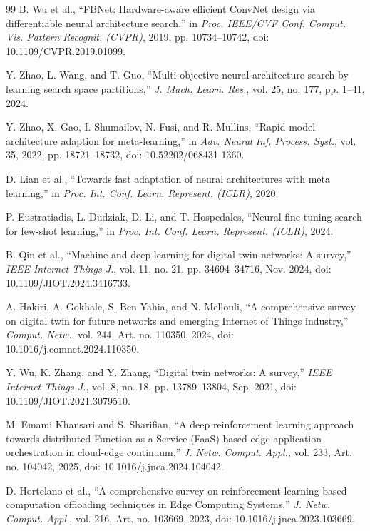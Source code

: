 \documentclass[a4paper,fleqn]{cas-sc}
\begin{document}
\begin{thebibliography}{99}
B. Wu et al., ``FBNet: Hardware-aware efficient ConvNet design via differentiable neural architecture search,'' in \emph{Proc. IEEE/CVF Conf. Comput. Vis. Pattern Recognit. (CVPR)}, 2019, pp. 10734--10742, doi: 10.1109/CVPR.2019.01099.

Y. Zhao, L. Wang, and T. Guo, ``Multi-objective neural architecture search by learning search space partitions,'' \emph{J. Mach. Learn. Res.}, vol. 25, no. 177, pp. 1--41, 2024.

Y. Zhao, X. Gao, I. Shumailov, N. Fusi, and R. Mullins,
``Rapid model architecture adaption for meta-learning,''
in \emph{Adv. Neural Inf. Process. Syst.},
vol. 35, 2022, pp. 18721--18732,
doi: 10.52202/068431-1360.

D. Lian et al.,
``Towards fast adaptation of neural architectures with meta learning,''
in \emph{Proc. Int. Conf. Learn. Represent. (ICLR)}, 2020.

P. Eustratiadis, L. Dudziak, D. Li, and T. Hospedales,
``Neural fine-tuning search for few-shot learning,''
in \emph{Proc. Int. Conf. Learn. Represent. (ICLR)}, 2024.

B. Qin et al., ``Machine and deep learning for digital twin networks: A survey,'' \emph{IEEE Internet Things J.}, vol. 11, no. 21, pp. 34694--34716, Nov. 2024, doi: 10.1109/JIOT.2024.3416733.

A. Hakiri, A. Gokhale, S. Ben Yahia, and N. Mellouli, ``A comprehensive survey on digital twin for future networks and emerging Internet of Things industry,'' \emph{Comput. Netw.}, vol. 244, Art. no. 110350, 2024, doi: 10.1016/j.comnet.2024.110350.

Y. Wu, K. Zhang, and Y. Zhang, ``Digital twin networks: A survey,'' \emph{IEEE Internet Things J.}, vol. 8, no. 18, pp. 13789--13804, Sep. 2021, doi: 10.1109/JIOT.2021.3079510.

M. Emami Khansari and S. Sharifian,
``A deep reinforcement learning approach towards distributed Function as a
Service (FaaS) based edge application orchestration in cloud-edge
continuum,''
\emph{J. Netw. Comput. Appl.}, vol. 233,
Art. no. 104042, 2025,
doi: 10.1016/j.jnca.2024.104042.

D. Hortelano et al.,
``A comprehensive survey on reinforcement-learning-based computation
offloading techniques in Edge Computing Systems,''
\emph{J. Netw. Comput. Appl.}, vol. 216,
Art. no. 103669, 2023, doi: 10.1016/j.jnca.2023.103669.


\end{thebibliography}
\end{document}
